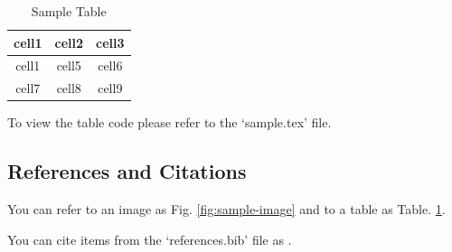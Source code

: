 \begin{table}[ht]
    \caption{Sample Table}
    \centering
    \begin{tabular}{ | c | c | c | }
        \hline
        cell1 & cell2 & cell3 \\
        \hline
        cell1 & cell5 & cell6 \\
        \hline
        cell7 & cell8 & cell9 \\
        \hline
    \end{tabular}
    \label{tab:sample-table}
\end{table}

\noindent To view the table code please refer to the `sample.tex' file.

\subsection{References and Citations}

You can refer to an image as Fig. \ref{fig:sample-image} and to a table as Table. \ref{tab:sample-table}.

\noindent You can cite items from the `references.bib' file as \cite{10.5120/ijca2020920393}.